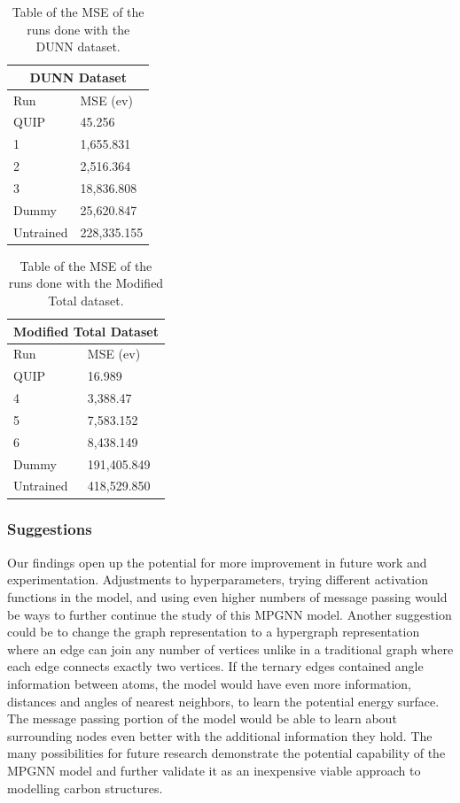 \documentclass[12pt, abstract = true]{scrartcl}
\begin{document}
\begin{table}
    \centering
    \begin{tabular}{p{3cm}|p{3cm}}
    \hline
    \multicolumn{2}{|c|}{DUNN Dataset} \\
    \hline
    Run  & MSE (ev)\\
    \hline
    QUIP   & 45.256\\
    1   & 1,655.831\\
    2    & 2,516.364\\
    3 & 18,836.808\\
    Dummy & 25,620.847\\
    Untrained & 228,335.155\\
    \hline
    \end{tabular}
    \caption{Table of the MSE of the runs done with the DUNN dataset.}\label{tab:dunn}
\end{table}

\begin{table}
    \centering
    \begin{tabular}{p{3cm}|p{3cm}}
    \hline
    \multicolumn{2}{|c|}{Modified Total Dataset} \\
    \hline
    Run  & MSE (ev)\\
    \hline
    QUIP   & 16.989 \\
    4   & 3,388.47 \\
    5 & 7,583.152 \\
    6    & 8,438.149\\
    Dummy & 191,405.849 \\
    Untrained & 418,529.850\\
    \hline
    \end{tabular}
    \caption{Table of the MSE of the runs done with the Modified Total dataset.}\label{tab:total}
\end{table}



\subsubsection{Suggestions} 

Our findings open up the potential for more improvement in future work and experimentation. Adjustments to hyperparameters, trying different activation functions in the model, and using even higher numbers of message passing would be ways to further continue the study of this MPGNN model. Another suggestion could be to change the graph representation to a hypergraph representation where an edge can join any number of vertices unlike in a traditional graph where each edge connects exactly two vertices. If the ternary edges contained angle information between atoms, the model would have even more information, distances and angles of nearest neighbors, to learn the potential energy surface. The message passing portion of the model would be able to learn about surrounding nodes even better with the additional information they hold. The many possibilities for future research demonstrate the potential capability of the MPGNN model and further validate it as an inexpensive viable approach to modelling carbon structures.


\newpage



\end{document}
